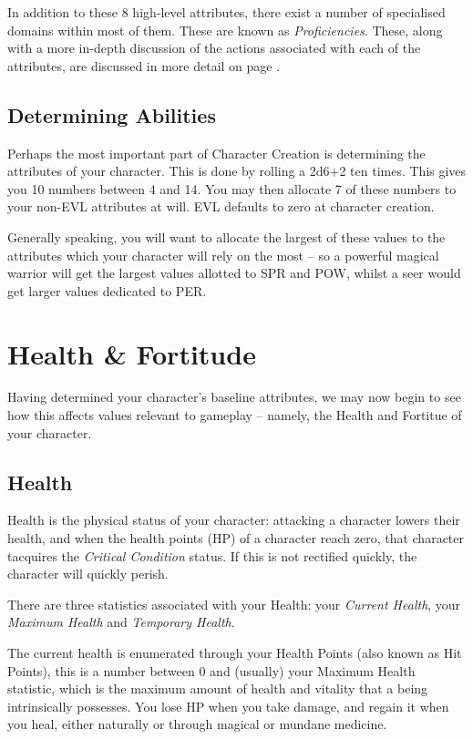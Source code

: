 In addition to these 8 high-level attributes, there exist a number of specialised domains within most of them. These are known as {\it Proficiencies}. These, along with a more in-depth discussion of the actions associated with each of the attributes, are discussed in more detail on page \pageref{S:Proficiencies}.


 \subsection*{Determining Abilities}
 
Perhaps the most important part of Character Creation is determining the attributes of your character. This is done by rolling a 2d6+2 ten times. This gives you 10 numbers between 4 and 14. You may then allocate 7 of these numbers to your non-EVL attributes at will. EVL defaults to zero at character creation. 
 
Generally speaking, you will want to allocate the largest of these values to the attributes which your character will rely on the most -- so a powerful magical warrior will get the largest values allotted to SPR and POW, whilst a seer would get larger values dedicated to PER. 
 

 \section{Health \& Fortitude}
 
 Having determined your character's baseline attributes, we may now begin to see how this affects values relevant to gameplay -- namely, the Health and Fortitue of your character.
 
 \subsection*{Health}
 
Health is the physical status of your character: attacking a character lowers their health, and when the health points (HP) of a character reach zero, that character tacquires the {\it Critical Condition} status. If this is not rectified quickly, the character will quickly perish. 

There are three statistics associated with your Health: your {\it Current Health}, your {\it Maximum Health} and {\it Temporary Health}. 

The current health is enumerated through your Health Points (also known as Hit Points), this is a number between 0 and (usually) your Maximum Health statistic, which is the maximum amount of health and vitality that a being intrinsically possesses. You lose HP when you take damage, and regain it when you heal, either naturally or through magical or mundane medicine. 

